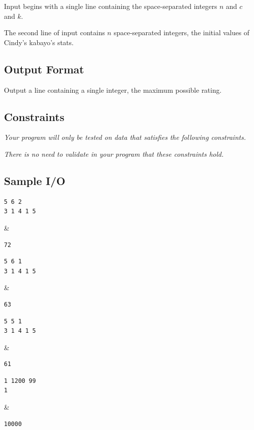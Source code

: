 Input begins with a single line containing the space-separated integers $n$ and $c$ and $k$.

The second line of input contains $n$ space-separated integers, the initial values of Cindy's kabayo's stats.

\subsection*{Output Format}

Output a line containing a single integer, the maximum possible rating.

\subsection*{Constraints}

\textit{Your program will only be tested on data that satisfies the following constraints.}


\textit{There is no need to validate in your program that these constraints hold.}

\subsection*{Sample I/O}

\begin{sampleIO}
\begin{verbatim}
5 6 2
3 1 4 1 5
\end{verbatim}
&
\begin{verbatim}
72
\end{verbatim}
\end{sampleIO}

\begin{sampleIO}
\begin{verbatim}
5 6 1
3 1 4 1 5
\end{verbatim}
&
\begin{verbatim}
63
\end{verbatim}
\end{sampleIO}

\begin{sampleIO}
\begin{verbatim}
5 5 1
3 1 4 1 5
\end{verbatim}
&
\begin{verbatim}
61
\end{verbatim}
\end{sampleIO}

\begin{sampleIO}
\begin{verbatim}
1 1200 99
1
\end{verbatim}
&
\begin{verbatim}
10000
\end{verbatim}
\end{sampleIO}

